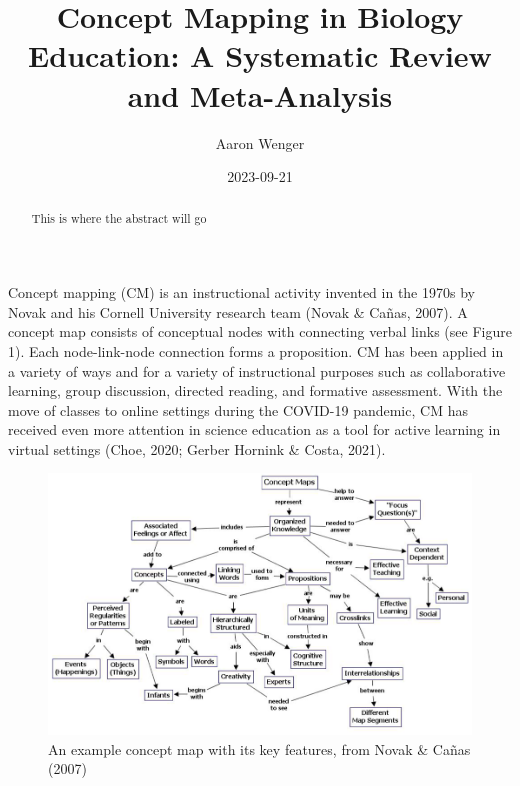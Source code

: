 \documentclass[
  letterpaper,
  DIV=11,
  numbers=noendperiod]{scrartcl}
\title{Concept Mapping in Biology Education: A Systematic Review and
Meta-Analysis}
\author{Aaron Wenger}
\date{2023-09-21}
\begin{document}
\maketitle
\begin{abstract}
This is where the abstract will go
\end{abstract}
\ifdefined\Shaded\renewenvironment{Shaded}{\begin{tcolorbox}[sharp corners, frame hidden, interior hidden, boxrule=0pt, breakable, borderline west={3pt}{0pt}{shadecolor}, enhanced]}{\end{tcolorbox}}\fi

Concept mapping (CM) is an instructional activity invented in the 1970s
by Novak and his Cornell University research team (Novak \& Cañas,
2007). A concept map consists of conceptual nodes with connecting verbal
links (see Figure 1). Each node-link-node connection forms a
proposition. CM has been applied in a variety of ways and for a variety
of instructional purposes such as collaborative learning, group
discussion, directed reading, and formative assessment. With the move of
classes to online settings during the COVID-19 pandemic, CM has received
even more attention in science education as a tool for active learning
in virtual settings (Choe, 2020; Gerber Hornink \& Costa, 2021).

\begin{figure}

{\centering \includegraphics{example_concept_map.png}

}

\caption{An example concept map with its key features, from Novak \&
Cañas (2007)}

\end{figure}
\end{document}
